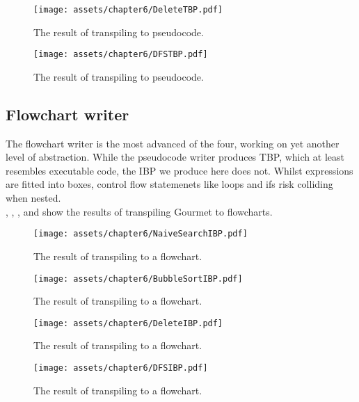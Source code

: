 \begin{figure}[ht!]
    \centering
    \texttt{[image: assets/chapter6/DeleteTBP.pdf]}
    \caption{The result of transpiling  to pseudocode.}
    \label{deleteBSTTBP}
\end{figure}

\begin{figure}[ht!]
    \centering
    \texttt{[image: assets/chapter6/DFSTBP.pdf]}
    \caption{The result of transpiling  to pseudocode.}
    \label{dfsTBP}
\end{figure}

\subsection{Flowchart writer}

The flowchart writer is the most advanced of the four, working on yet another level of abstraction. While the pseudocode writer produces TBP, which at least resembles executable code, the IBP we produce here does not. Whilst expressions are fitted into boxes, control flow statemenets like loops and ifs risk colliding when nested. \\

, , , and  show the results of transpiling Gourmet to flowcharts. \\

\begin{figure}[ht!]
    \centering
    \texttt{[image: assets/chapter6/NaiveSearchIBP.pdf]}
    \caption{The result of transpiling  to a flowchart.}
    \label{naiveSearchIBP}
\end{figure}

\begin{figure}[ht!]
    \centering
    \texttt{[image: assets/chapter6/BubbleSortIBP.pdf]}
    \caption{The result of transpiling  to a flowchart.}
    \label{bubbleSortIBP}
\end{figure}

\begin{figure}[ht!]
    \centering
    \texttt{[image: assets/chapter6/DeleteIBP.pdf]}
    \caption{The result of transpiling  to a flowchart.}
    \label{deleteBSTIBP}
\end{figure}

\begin{figure}[ht!]
    \centering
    \texttt{[image: assets/chapter6/DFSIBP.pdf]}
    \caption{The result of transpiling  to a flowchart.}
    \label{dfsIBP}
\end{figure}

